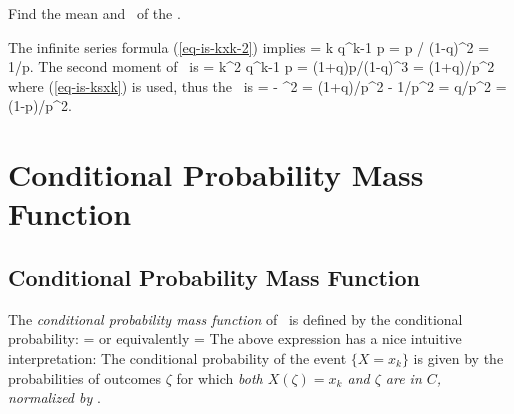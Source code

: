 	\item {}
	Find the mean and \var\ of the \geomrv.

	The infinite series formula (\ref{eq-is-kxk-2}) implies
		 = \sumktoi k q^{k-1} p = p / (1-q)^2 = 1/p.
	\eeql
	The second moment of \X\ is
		 = \sumktoi k^2 q^{k-1} p = (1+q)p/(1-q)^3 = (1+q)/p^2
	\eeql
	where (\ref{eq-is-ksxk}) is used,
	thus the \var\ is
		 =  - ^2
		= (1+q)/p^2 - 1/p^2 = q/p^2 = (1-p)/p^2.
	\eeql

\eit


\section{Conditional Probability Mass Function}
\subsection{Conditional Probability Mass Function}
\bit
	\item The \emph{conditional probability mass function}
	of \X\ is defined by the conditional probability:
		 = 
	\eeql
	or equivalently
		 = 
	\eeql
	The above expression has a nice intuitive interpretation:
	The conditional probability of the event $\{X = x_k\}$
	is given by the probabilities of outcomes $\zeta$
	for which \emph{both $X(\zeta) = x_k$ and $\zeta$ are in $C$,
	normalized by }.

